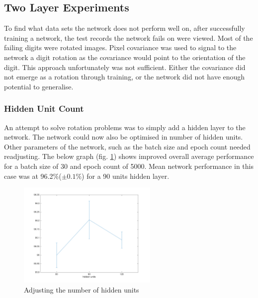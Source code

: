 \documentclass[11]{article}
\begin{document}
\subsection{Two Layer Experiments}

To find what data sets the network does not perform well on, after successfully training a network, the test records the network fails on were viewed.  Most of the failing digits were rotated images. Pixel covariance was used to signal to the network a digit rotation as the covariance would point to the orientation of the digit. This approach unfortunately was not sufficient. Either the covariance did not emerge as a rotation through training, or the network did not have enough potential to generalise. 

\subsubsection{Hidden Unit Count}

An attempt to solve rotation problems was to simply add a hidden layer to the network. The network could now also be optimised in number of hidden units. Other parameters of the network, such as the batch size and epoch count needed readjusting. The below graph (fig. \ref{fig:hiddenunits}) shows improved overall average performance for a batch size of 30 and epoch count of 5000.  Mean network performance in this case was at 96.2\%($\pm 0.1\%$) for a 90 units hidden layer. 
\begin{figure}[h]
\centering
\includegraphics[width=0.6\textwidth]{hiddenunits.png}
\caption{Adjusting the number of hidden units}
\label{fig:hiddenunits}
\end{figure}
\end{document}
